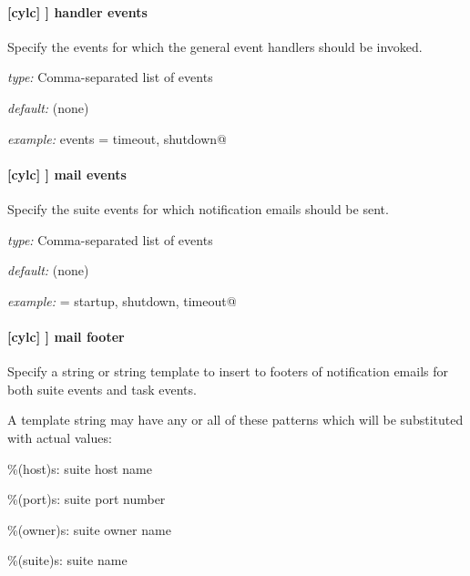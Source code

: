 \paragraph[handler events]{[cylc] \textrightarrow [[events]] \textrightarrow handler events}

Specify the events for which the general event handlers should be invoked.

\begin{myitemize}
    \item {\em type:} Comma-separated list of events
    \item {\em default:} (none)
    \item {\em example:} \lstinline@handler events = timeout, shutdown@
\end{myitemize}

\paragraph[mail events]{[cylc] \textrightarrow [[events]] \textrightarrow mail events}

Specify the suite events for which notification emails should be sent.

\begin{myitemize}
    \item {\em type:} Comma-separated list of events
    \item {\em default:} (none)
    \item {\em example:} \lstinline@handler = startup, shutdown, timeout@
\end{myitemize}

\paragraph[mail footer]{[cylc] \textrightarrow [[events]] \textrightarrow mail footer}

Specify a string or string template to insert to footers of notification emails
for both suite events and task events.

A template string may have any or all of these patterns which will be
substituted with actual values:
\begin{myitemize}
    \item \%(host)s: suite host name
    \item \%(port)s: suite port number
    \item \%(owner)s: suite owner name
    \item \%(suite)s: suite name
\end{myitemize}

